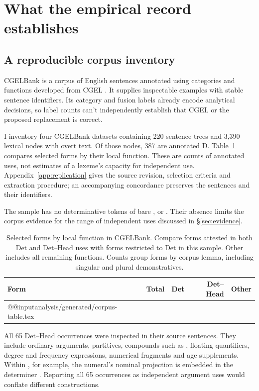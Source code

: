 \documentclass[12pt]{article}
\makeatletter
\newcommand{\tablebody}[1]{\csname @@input\endcsname #1 }
\makeatother
\begin{document}
\section{What the empirical record establishes}\label{sec:empirical}

\subsection{A reproducible corpus inventory}

CGELBank is a corpus of English sentences annotated using categories and functions developed from CGEL \citep{reynolds2023unified}. It supplies inspectable examples with stable sentence identifiers. Its category and fusion labels already encode analytical decisions, so label counts can't independently establish that CGEL or the proposed replacement is correct.

I inventory four CGELBank datasets containing 220 sentence trees and 3,390 lexical nodes with overt text. Of those nodes, 387 are annotated D. Table~\ref{tab:corpus} compares selected forms by their local function. These are counts of annotated uses, not estimates of a lexeme's capacity for independent use. Appendix~\ref{app:replication} gives the source revision, selection criteria and extraction procedure; an accompanying concordance preserves the sentences and their identifiers.

The sample has no determinative tokens of bare ,  or . Their absence limits the corpus evidence for the range of independent uses discussed in §\ref{sec:evidence}.

\begin{table}[tb]
\centering\small
\caption{Selected forms by local function in CGELBank. Compare forms attested in both Det and Det--Head uses with forms restricted to Det in this sample. Other includes all remaining functions. Counts group forms by corpus lemma, including singular and plural demonstratives.}\label{tab:corpus}
\begin{tabular}{lrrrr}
\toprule
Form & Total & Det & Det--Head & Other \\
\midrule
\tablebody{analysis/generated/corpus-table.tex}
\bottomrule
\end{tabular}
\end{table}

All 65 Det--Head occurrences were inspected in their source sentences. They include ordinary arguments, partitives, compounds such as , floating quantifiers, degree and frequency expressions, numerical fragments and age supplements. Within , for example, the numeral's nominal projection is embedded in the determiner . Reporting all 65 occurrences as independent argument uses would conflate different constructions.
\end{document}
